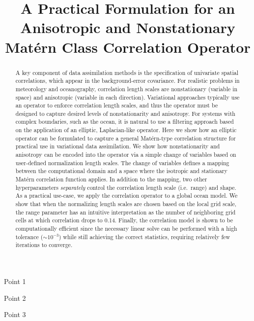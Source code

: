 \documentclass[draft]{Feb-3-22-latex-templates/agujournal2019}
\begin{document}
\title{A Practical Formulation for an Anisotropic and Nonstationary Mat\'ern Class
    Correlation Operator
}


\begin{keypoints}
    \item Point 1
    \item Point 2
    \item Point 3
\end{keypoints}

\begin{abstract}
    A key component of data assimilation methods is the specification of
    univariate spatial correlations, which appear in the background-error
    covariance.
    For realistic problems in meteorology and oceanography,
    correlation length scales are nonstationary (variable in space) and
    anisotropic (variable in each direction).
    Variational approaches typically use an operator to enforce correlation
    length scales, and thus the operator must be designed to capture
    desired levels of nonstationarity and anisotropy.
    For systems with complex boundaries, such as the ocean, it is natural
    to use a filtering approach based on the application of an elliptic,
    Laplacian-like operator.
    Here we show how an elliptic operator can be formulated to capture a general
    Mat\'ern-type correlation structure for practical use in variational data
    assimilation.
    We show how nonstationarity and anisotropy can be encoded into the operator
    via a simple change of variables based on user-defined
    normalization length scales.
    The change of variables defines a mapping between the computational domain
    and a space where the isotropic and stationary Mat\'ern correlation function
    applies.
    In addition to the mapping, two other hyperparameters \textit{separately}
    control the correlation length scale (i.e.\ range) and shape.
    As a practical use-case, we apply the correlation operator to a global ocean model.
    We show that when the normalizing length scales are chosen
    based on the local grid scale, the range parameter has an intuitive
    interpretation as the number of neighboring grid cells at which correlation drops to 0.14.
    Finally, the correlation model is shown to be computationally efficient
    since the necessary linear solve can be performed with a high tolerance
    ($\sim10^{-3}$) while still achieving the correct statistics, requiring relatively
    few iterations to converge.
\end{abstract}
\end{document}

